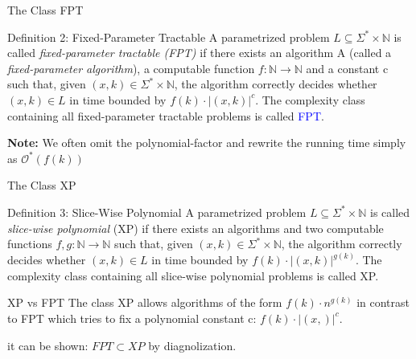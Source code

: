 \begin{frame}[c]{The Class FPT}

\begin{block}{Definition 2: Fixed-Parameter Tractable}
A parametrized problem $L\subseteq\Sigma^*\times\mathbb{N}$ is called \textit{fixed-parameter tractable (FPT)} if there exists an algorithm A (called a \textit{fixed-parameter algorithm}), a computable function $f:\mathbb{N} \rightarrow \mathbb{N}$ and a constant c such that, given $(x,k) \in \Sigma^* \times \mathbb{N}$, the algorithm  correctly decides whether $(x,k) \in L$ in time bounded by $f(k) \cdot |(x,k)|^c$. The complexity class containing all fixed-parameter tractable problems is called \textcolor{blue}{FPT}.
\end{block}

\textbf{Note: } We often omit the polynomial-factor and rewrite the running time simply as $\mathcal{O}^*(f(k))$ 
\end{frame}

\begin{frame}[c]{The Class XP}

\begin{block}{Definition 3: Slice-Wise Polynomial}
A parametrized problem $L\subseteq \Sigma^* \times \mathbb{N}$ is called \textit{slice-wise polynomial} (XP) if there exists an algorithms  and two computable functions $f,g:\mathbb{N}\rightarrow \mathbb{N}$ such that, given $(x,k) \in \Sigma^* \times \mathbb{N}$, the algorithm  correctly decides whether $(x,k) \in L$ in time bounded by $f(k)\cdot|(x,k)|^{g(k)}$. The complexity class containing all slice-wise polynomial problems is called XP. 

\end{block}

\begin{alertblock}{XP vs FPT}
The class XP allows algorithms of the form $f(k) \cdot n^{g(k)}$ in contrast to FPT which tries to fix a polynomial constant c: $f(k)\cdot |(x,)|^c$. 

it can be shown: $FPT \subset XP$ by diagnolization.
\end{alertblock}
\end{frame}

